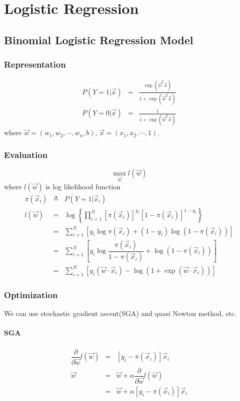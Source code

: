 \chapter{Logistic Regression}


\section{Binomial Logistic Regression Model}


\subsection{Representation}

\begin{eqnarray}
  P(Y=1|\vec{x}) &=& \frac{\exp(\vec{w}^T\vec{x})}{1+\exp(\vec{w}^T\vec{x})} \\
  P(Y=0|\vec{x}) &=& \frac{1}{1+\exp(\vec{w}^T\vec{x})}
\end{eqnarray}
where $\vec{w}=(w_1, w_2,\cdots, w_n, b)$, $\vec{x}=(x_1,x_2,\cdots, 1)$.


\subsection{Evaluation}
\begin{equation}
\max_{\vec{w}} l(\vec{w})
\end{equation}
where $l(\vec{w})$ is log likelihood function
\begin{eqnarray*}
\pi(\vec{x}_i) & \triangleq & P(Y=1|\vec{x}_i) \\
l(\vec{w}) &=& \log\left\{\prod\limits_{i=1}^N{\left[\pi(\vec{x}_i)\right]^{y_i}\left[1-\pi(\vec{x}_i)\right]^{1-y_i}}\right\} \\
           &=& \sum\limits_{i=1}^N\left[y_i\log\pi(\vec{x}_i)+(1-y_i)\log(1-\pi(\vec{x}_i))\right] \\
		   &=& \sum\limits_{i=1}^N\left[y_i\log\dfrac{\pi(\vec{x}_i)}{1-\pi(\vec{x}_i)}+\log(1-\pi(\vec{x}_i))\right] \\
		   &=& \sum\limits_{i=1}^N\left[y_i(\vec{w}\cdot\vec{x}_i)-\log(1+\exp(\vec{w}\cdot\vec{x}_i))\right]
\end{eqnarray*}


\subsection{Optimization}
We can use stochastic gradient ascent(SGA) and quasi Newton method, etc.


\subsubsection{SGA}
\begin{eqnarray}
\dfrac{\partial}{\partial \vec{w}}l(\vec{w}) &=& \left[y_i - \pi(\vec{x}_i) \right]\vec{x}_i \\
\vec{w} &=& \vec{w}+\alpha\dfrac{\partial}{\partial \vec{w}}l(\vec{w}) \nonumber \\
        &=& \vec{w} + \alpha\left[y_i - \pi(\vec{x}_i) \right]\vec{x}_i
\end{eqnarray}
